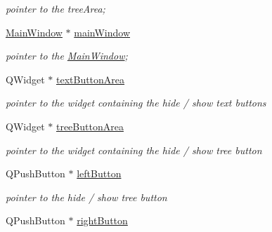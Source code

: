 \begin{DoxyCompactItemize}
\begin{DoxyCompactList}\small\item\em pointer to the tree\+Area; \end{DoxyCompactList}\item 
\hypertarget{classArea_a78dfb0c8316dbe90af1e5c905db5b6d1}{\hyperlink{classMainWindow}{Main\+Window} $\ast$ \hyperlink{classArea_a78dfb0c8316dbe90af1e5c905db5b6d1}{main\+Window}}\label{classArea_a78dfb0c8316dbe90af1e5c905db5b6d1}

\begin{DoxyCompactList}\small\item\em pointer to the \hyperlink{classMainWindow}{Main\+Window}; \end{DoxyCompactList}\item 
\hypertarget{classArea_a6c88fecf579e816309421ebb2f4110e8}{Q\+Widget $\ast$ \hyperlink{classArea_a6c88fecf579e816309421ebb2f4110e8}{text\+Button\+Area}}\label{classArea_a6c88fecf579e816309421ebb2f4110e8}

\begin{DoxyCompactList}\small\item\em pointer to the widget containing the hide / show text buttons \end{DoxyCompactList}\item 
\hypertarget{classArea_a48df84597b567dfc8b54305ca9faf072}{Q\+Widget $\ast$ \hyperlink{classArea_a48df84597b567dfc8b54305ca9faf072}{tree\+Button\+Area}}\label{classArea_a48df84597b567dfc8b54305ca9faf072}

\begin{DoxyCompactList}\small\item\em pointer to the widget containing the hide / show tree button \end{DoxyCompactList}\item 
\hypertarget{classArea_ac3abf6be3202aedd2cc9ccf8da053989}{Q\+Push\+Button $\ast$ \hyperlink{classArea_ac3abf6be3202aedd2cc9ccf8da053989}{left\+Button}}\label{classArea_ac3abf6be3202aedd2cc9ccf8da053989}

\begin{DoxyCompactList}\small\item\em pointer to the hide / show tree button \end{DoxyCompactList}\item 
\hypertarget{classArea_a7dda00e73b5dda5bcf308bc9451d47aa}{Q\+Push\+Button $\ast$ \hyperlink{classArea_a7dda00e73b5dda5bcf308bc9451d47aa}{right\+Button}}\label{classArea_a7dda00e73b5dda5bcf308bc9451d47aa}


\end{DoxyCompactItemize}
